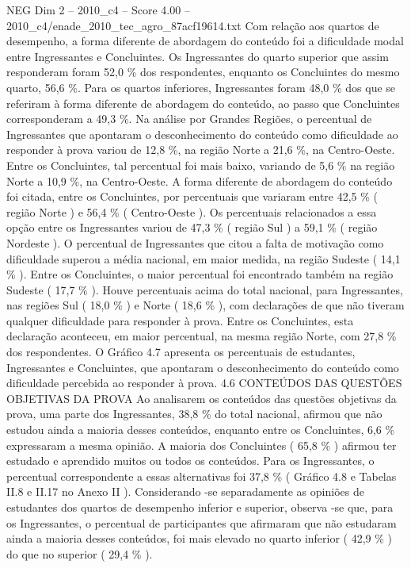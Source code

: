 \begin{textsample}{NEG Dim 2 – 2010\_c4 – Score 4.00 – 2010\_c4/enade\_2010\_tec\_agro\_87acf19614.txt}
Com relação aos quartos de desempenho, a forma diferente de abordagem do conteúdo foi a dificuldade modal entre Ingressantes e Concluintes.
Os Ingressantes do quarto superior que assim responderam foram 52,0 \% dos respondentes, enquanto os Concluintes do mesmo quarto, 56,6 \%.
Para os quartos inferiores, Ingressantes foram 48,0 \% dos que se referiram à forma diferente de abordagem do conteúdo, ao passo que Concluintes corresponderam a 49,3 \%.
Na análise por Grandes Regiões, o percentual de Ingressantes que apontaram o desconhecimento do conteúdo como dificuldade ao responder à prova variou de 12,8 \%, na região Norte a 21,6 \%, na Centro-Oeste.
Entre os Concluintes, tal percentual foi mais baixo, variando de 5,6 \% na região Norte a 10,9 \%, na Centro-Oeste.
A forma diferente de abordagem do conteúdo foi citada, entre os Concluintes, por percentuais que variaram entre 42,5 \% ( região Norte ) e 56,4 \% ( Centro-Oeste ).
Os percentuais relacionados a essa opção entre os Ingressantes variou de 47,3 \% ( região Sul ) a 59,1 \% ( região Nordeste ).
O percentual de Ingressantes que citou a falta de motivação como dificuldade superou a média nacional, em maior medida, na região Sudeste ( 14,1 \% ).
Entre os Concluintes, o maior percentual foi encontrado também na região Sudeste ( 17,7 \% ).
Houve percentuais acima do total nacional, para Ingressantes, nas regiões Sul ( 18,0 \% ) e Norte ( 18,6 \% ), com declarações de que não tiveram qualquer dificuldade para responder à prova.
Entre os Concluintes, esta declaração aconteceu, em maior percentual, na mesma região Norte, com 27,8 \% dos respondentes.
O Gráfico 4.7 apresenta os percentuais de estudantes, Ingressantes e Concluintes, que apontaram o desconhecimento do conteúdo como dificuldade percebida ao responder à prova. 4.6 CONTEÚDOS DAS QUESTÕES OBJETIVAS DA PROVA Ao analisarem os conteúdos das questões objetivas da prova, uma parte dos Ingressantes, 38,8 \% do total nacional, afirmou que não estudou ainda a maioria desses conteúdos, enquanto entre os Concluintes, 6,6 \% expressaram a mesma opinião.
A maioria dos Concluintes ( 65,8 \% ) afirmou ter estudado e aprendido muitos ou todos os conteúdos.
Para os Ingressantes, o percentual correspondente a essas alternativas foi 37,8 \% ( Gráfico 4.8 e Tabelas II.8 e II.17 no Anexo II ).
Considerando -se separadamente as opiniões de estudantes dos quartos de desempenho inferior e superior, observa -se que, para os Ingressantes, o percentual de participantes que afirmaram que não estudaram ainda a maioria desses conteúdos, foi mais elevado no quarto inferior ( 42,9 \% ) do que no superior ( 29,4 \% ).

\end{textsample}
